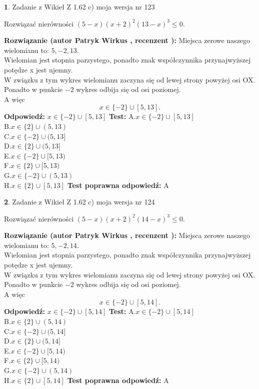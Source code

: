 \documentclass[12pt, a4paper]{article}
\theoremstyle{definition} %
\newtheorem{zad}{}
\newcommand{\zadStart}[1]{\begin{zad}#1\newline}
\newcommand{\zadStop}{\end{zad}}
\newcommand{\rozwStart}[2]{\noindent \textbf{Rozwiązanie (autor #1 , recenzent #2): }\newline}
\newcommand{\rozwStop}{\newline}
\newcommand{\odpStart}{\noindent \textbf{Odpowiedź:}\newline}
\newcommand{\odpStop}{\newline}
\newcommand{\testStart}{\noindent \textbf{Test:}\newline}
\newcommand{\testStop}{\newline}
\newcommand{\kluczStart}{\noindent \textbf{Test poprawna odpowiedź:}\newline}
\newcommand{\kluczStop}{\newline}
\begin{document}
\zadStart{Zadanie z Wikieł Z 1.62 c) moja wersja nr 123}

Rozwiązać nierówności $(5-x)(x+2)^{2}(13-x)^{3}\le0$.
\zadStop
\rozwStart{Patryk Wirkus}{}
Miejsca zerowe naszego wielomianu to: $5, -2, 13$.\\
Wielomian jest stopnia parzystego, ponadto znak współczynnika przy\linebreak najwyższej potędze x jest ujemny.\\ W związku z tym wykres wielomianu zaczyna się od lewej strony powyżej osi OX.\\
Ponadto w punkcie $-2$ wykres odbija się od osi poziomej.\\
A więc $$x \in \{-2\} \cup [5,13].$$
\rozwStop
\odpStart
$x \in \{-2\} \cup [5,13]$
\odpStop
\testStart
A.$x \in \{-2\} \cup [5,13]$\\
B.$x \in \{2\} \cup (5,13)$\\
C.$x \in \{-2\} \cup (5,13]$\\
D.$x \in \{2\} \cup (5,13]$\\
E.$x \in \{-2\} \cup [5,13)$\\
F.$x \in \{2\} \cup [5,13)$\\
G.$x \in \{-2\} \cup (5,13)$\\
H.$x \in \{2\} \cup [5,13]$
\testStop
\kluczStart
A
\kluczStop



\zadStart{Zadanie z Wikieł Z 1.62 c) moja wersja nr 124}

Rozwiązać nierówności $(5-x)(x+2)^{2}(14-x)^{3}\le0$.
\zadStop
\rozwStart{Patryk Wirkus}{}
Miejsca zerowe naszego wielomianu to: $5, -2, 14$.\\
Wielomian jest stopnia parzystego, ponadto znak współczynnika przy\linebreak najwyższej potędze x jest ujemny.\\ W związku z tym wykres wielomianu zaczyna się od lewej strony powyżej osi OX.\\
Ponadto w punkcie $-2$ wykres odbija się od osi poziomej.\\
A więc $$x \in \{-2\} \cup [5,14].$$
\rozwStop
\odpStart
$x \in \{-2\} \cup [5,14]$
\odpStop
\testStart
A.$x \in \{-2\} \cup [5,14]$\\
B.$x \in \{2\} \cup (5,14)$\\
C.$x \in \{-2\} \cup (5,14]$\\
D.$x \in \{2\} \cup (5,14]$\\
E.$x \in \{-2\} \cup [5,14)$\\
F.$x \in \{2\} \cup [5,14)$\\
G.$x \in \{-2\} \cup (5,14)$\\
H.$x \in \{2\} \cup [5,14]$
\testStop
\kluczStart
A
\kluczStop
\end{document}
